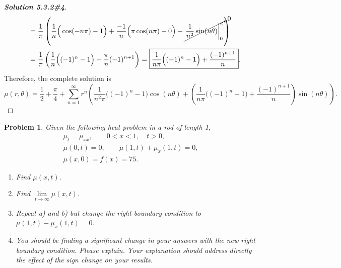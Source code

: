 \documentclass[letterpaper,11pt]{article} %
\theoremstyle{plain}
\newtheorem{problem}{Problem}
\begin{document}
\begin{proof}[\textbf{Solution 5.3.2\#4}]
\begin{align*}
        &&&= \frac{1}{\pi}\left(\frac{1}{n}\Big(\cos(-n\pi) -1\Big) + \frac{-1}{n}\Big(\pi\cos(n\pi) - 0\Big) - \cancelto{0}{\left.\frac{1}{n^2} \sin(n\theta) \right|_0^\pi}\right) \\
        &&&= \frac{1}{\pi} \left(\frac{1}{n} \Big((-1)^n - 1\Big) + \frac{\pi}{n}(-1)^{n+1}\right) = \boxed{\frac{1}{n\pi} \Big((-1)^n - 1\Big) + \frac{(-1)^{n+1}}{n}}.
     \end{align*}
     Therefore, the complete solution is
      \begin{equation*}
     \boxed{\mu(r, \theta) = \frac{1}{2} + \frac{\pi}{4} + \sum_{n=1}^\infty r^n \left(\frac{1}{n^2 \pi}\Big((-1)^n -1 \Big) \cos(n\theta) + \left(\frac{1}{n\pi} \Big((-1)^n - 1\Big) + \frac{(-1)^{n+1}}{n}\right) \sin(n\theta) \right).}
     \end{equation*}
\end{proof}


    
\begin{problem} %
    Given the following heat problem in a rod of length 1,
    \begin{gather*}
        \mu_t = \mu_{xx}, \qquad 0 < x< 1, \quad t > 0, \\
        \mu(0, t) = 0, \qquad \mu(1, t) + \mu_x(1,t) = 0,\\
        \mu(x, 0) = f(x) = 75.
    \end{gather*}
    \begin{enumerate}[label=\alph*.)]
        \item Find $\mu(x,t)$.
        \item Find $\lim\limits_{t \to \infty} \mu(x, t)$.
        \item Repeat a) and b) but change the right boundary condition to $\mu(1,t) -\mu_x(1,t) = 0$.
        \item You should be finding a significant change in your answers with the new right boundary condition. Please explain. Your explanation should address directly the effect of the sign change on your results.
    \end{enumerate}
\end{problem}
\end{document}
